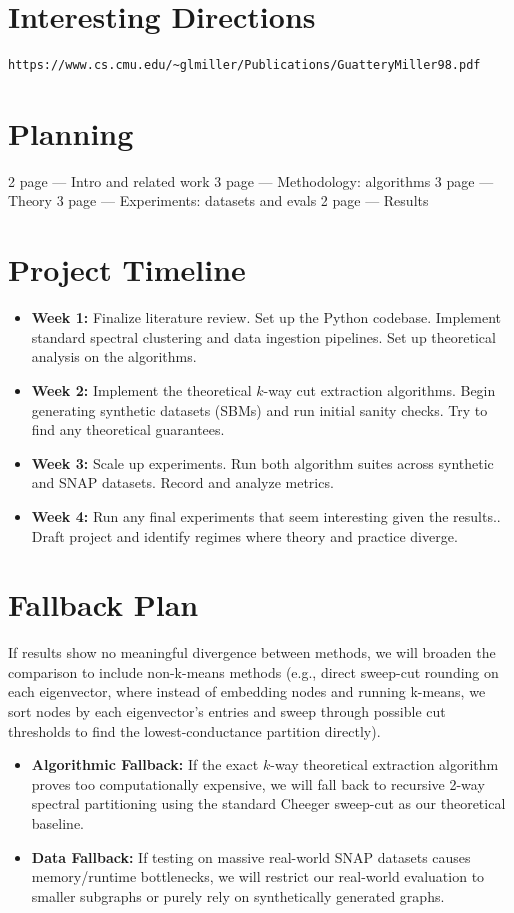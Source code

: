 \documentclass{article}
\theoremstyle{definition}
\theoremstyle{remark}
\begin{document}
\section{Interesting Directions}
\begin{verbatim}
https://www.cs.cmu.edu/~glmiller/Publications/GuatteryMiller98.pdf
\end{verbatim}

\section{Planning}
2 page — Intro and related work
3 page — Methodology: algorithms
3 page — Theory
3 page — Experiments: datasets and evals
2 page — Results

\section{Project Timeline}

\begin{itemize}
    \item \textbf{Week 1: } Finalize literature review. Set up the Python  codebase. Implement standard spectral clustering and data ingestion pipelines. Set up theoretical analysis on the algorithms.
    \item \textbf{Week 2: } Implement the theoretical $k$-way cut extraction algorithms. Begin generating synthetic datasets (SBMs) and run initial sanity checks. Try to find any theoretical guarantees.
    \item \textbf{Week 3: } Scale up experiments. Run both algorithm suites across synthetic and SNAP datasets. Record and analyze metrics.
    \item \textbf{Week 4: } Run any final experiments that seem interesting given the results.. Draft project and identify regimes where theory and practice diverge. 
\end{itemize}

\section{Fallback Plan}
If results show no meaningful divergence between methods, we will broaden the comparison to include non-k-means methods (e.g., direct sweep-cut rounding on each eigenvector, where instead of embedding nodes and running k-means, we sort nodes by each eigenvector's entries and sweep through possible cut thresholds to find the lowest-conductance partition directly).
\begin{itemize}
    \item \textbf{Algorithmic Fallback:} If the exact $k$-way theoretical extraction algorithm proves too computationally expensive, we will fall back to recursive 2-way spectral partitioning using the standard Cheeger sweep-cut as our theoretical baseline.
    \item \textbf{Data Fallback:} If testing on massive real-world SNAP datasets causes memory/runtime bottlenecks, we will restrict our real-world evaluation to smaller subgraphs or purely rely on synthetically generated graphs.
\end{itemize}
\end{document}
